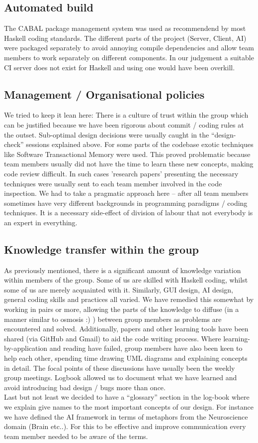 \documentclass[11pt]{article}
\begin{document}
\subsection{Automated build}
The CABAL package management system was used as recommendend by most
Haskell coding standards. The different parts of the project (Server, Client,
AI) were packaged separately to avoid annoying compile dependencies and
allow team members to work separately on different components. In our judgement
a suitable CI server does not exist for Haskell and using one would have been 
overkill.

\subsection{Management / Organisational policies}
We tried to keep it lean here: There is a culture of trust within the group which
can be justified because we have been rigorous about commit / coding rules at the
outset. Sub-optimal design decisions were usually caught in the ``design-check'' sessions 
explained above. For some parts of the codebase exotic techniques like Software
Transactional Memory were used. This proved problematic because team members
usually did not have the time to learn these new concepts, making code review
difficult. In such cases 'research papers' presenting the necessary techniques
were usually sent to each team member involved in the code inspection. We had
to take a pragmatic approach here -- after all team members sometimes have very
different backgrounds in programming paradigms / coding techniques. It is a necessary
side-effect of division of labour that not everybody is an expert in everything.

\subsection{Knowledge transfer within the group}
As previously mentioned, there is a significant amount of knowledge variation
within members of the group. Some of us are skilled with Haskell coding, whilst
some of us are merely acquainted with it. Similarly, GUI design, AI design,
general coding skills and practices all varied. We have remedied this 
somewhat by working in pairs or more, allowing the parts of the knowledge to 
diffuse (in a manner similar to osmosis :) ) between group
members as problems are encountered and solved. Additionally, papers and other
learning tools have been shared (via GitHub and Gmail) to aid the code writing
process. Where  learning-by-application and reading have failed, group members have also been
keen to help each other, spending time drawing UML diagrams and explaining concepts
in detail. The focal points of these discussions have usually been the weekly 
group meetings. Logbook allowed us to document what we have learned and avoid
introducing bad design / bugs more than once. 
\\ 
Last but not least we decided to have a ``glossary'' section in the log-book 
where we explain give names to the most important concepts of our design. For instance
we have defined the AI framework in terms of metaphors from the Neuroscience
domain (Brain etc..). For this to be effective and improve communication every 
team member needed to be aware of the terms.
\end{document}
